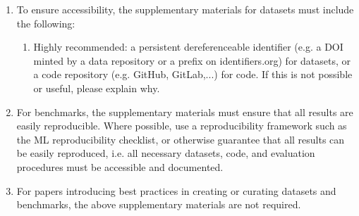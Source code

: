 \begin{enumerate}
\item To ensure accessibility, the supplementary materials for datasets must include the following:
\begin{enumerate}
  \item Highly recommended: a persistent dereferenceable identifier (e.g. a DOI minted by a data repository or a prefix on identifiers.org) for datasets, or a code repository (e.g. GitHub, GitLab,...) for code. If this is not possible or useful, please explain why.
\end{enumerate}

\item For benchmarks, the supplementary materials must ensure that all results are easily reproducible. Where possible, use a reproducibility framework such as the ML reproducibility checklist, or otherwise guarantee that all results can be easily reproduced, i.e. all necessary datasets, code, and evaluation procedures must be accessible and documented.

\item For papers introducing best practices in creating or curating datasets and benchmarks, the above supplementary materials are not required.
\end{enumerate}


